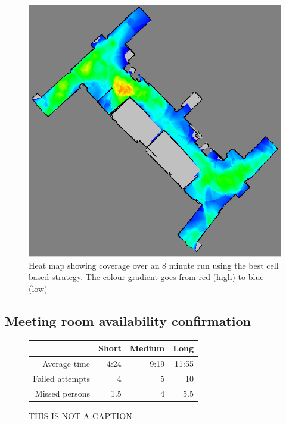 \documentclass[conference]{IEEEtran}
\begin{document}
\begin{figure}
  \includegraphics[width=\columnwidth]{4-1_1_heatmap}
  \caption{Heat map showing coverage over an 8 minute run using the best cell based strategy. The colour gradient goes from red (high) to blue (low)}
  \label{fig:heatmap}
\end{figure}

\subsection{Meeting room availability confirmation}
\begin{figure}
  \centering
    \begin{tabular}{r|r|r|r|}
    \cline{2-4}
    &Short&Medium&Long\\\hline
    \multicolumn{1}{|r|}{Average time}&4:24&9:19&11:55\\\hline
    \multicolumn{1}{|r|}{Failed attempts}&4&5&10\\\hline
    \multicolumn{1}{|r|}{Missed persons}&1.5&4&5.5\\\hline
  \end{tabular}
  \caption{THIS IS NOT A CAPTION}
  \label{fig:fullsystem}
\end{figure}
\end{document}
